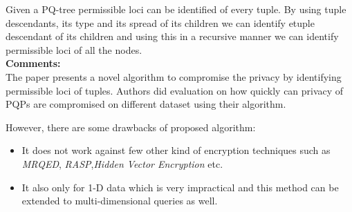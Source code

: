 \documentclass[a4paper,12pt, twoside]{article}
\begin{document}
Given a PQ-tree permissible loci can be identified of every tuple. By using tuple descendants, its type and its spread of its children we can identify etuple descendant of its children and using this in a recursive manner we can identify permissible loci of all the nodes.\\


\textbf{Comments:}\\
The paper presents a novel algorithm to compromise the privacy by identifying permissible loci of tuples. Authors did evaluation on how quickly can privacy of PQPs are compromised on different dataset using their algorithm.

However, there are some drawbacks of proposed algorithm:
\begin{itemize}
	\item It does not work against few other kind of encryption techniques such as \emph{MRQED}, \emph{RASP},\emph{Hidden Vector Encryption} etc. 	
	\item It also only for 1-D data which is very impractical and this method can be extended to multi-dimensional queries as well.
\end{itemize}
\end{document}
